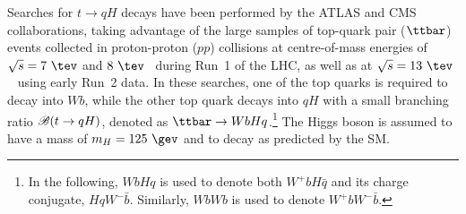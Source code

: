 \documentclass[PAPER, coverpage, atlasdraft=true, texlive=2016, UKenglish]{\ATLASLATEXPATH atlasdoc}
\begin{document}
Searches for $t \to qH$ decays have been performed by the ATLAS and CMS collaborations, taking advantage of the large samples
of top-quark pair ($\ttbar$) events collected in proton-proton ($pp$) collisions at centre-of-mass energies of $\sqrt{s}=7~\tev$ and $8~\tev$~\cite{Aad:2014dya,Aad:2015pja,Khachatryan:2016atv} during Run~1 of the LHC, as well as at $\sqrt{s}=13~\tev$~\cite{fcnc36} using early Run~2 data.
In these searches, one of the top quarks is required to decay into $Wb$, while the other top quark decays into $qH$ with a small branching ratio 
 $\mathscr{B}(t\to qH)$, denoted as $\ttbar \to WbHq$.\footnote{In the following, $WbHq$ is used to denote both $W^+b H\bar{q}$ and its charge conjugate, $HqW^- \bar{b}$. Similarly, 
$WbWb$ is used to denote $W^+b W^- \bar{b}$.}  The Higgs boson is assumed to have a mass of $m_H=125~\gev$ and to decay as predicted by
the SM.
\end{document}
